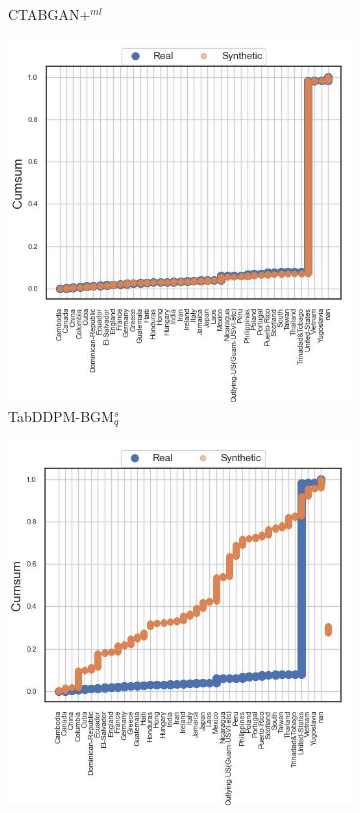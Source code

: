 \begin{figure}[H]
\begin{subfigure}{0.23\textwidth}
		\caption{CTABGAN+$^{ml}$}
	\end{subfigure}
	\begin{subfigure}{0.23\textwidth}
		\centering
		\includegraphics[width=\textwidth]{images/cdf/tab-ddpm-bgm-simTune.jpg}
		\caption{TabDDPM-BGM$^{s}_q$}
	\end{subfigure}
	\begin{subfigure}{0.23\textwidth}
		\centering
		\includegraphics[width=\textwidth]{images/cdf/tab-ddpm-ft.jpg}

\end{subfigure}
\end{figure}
